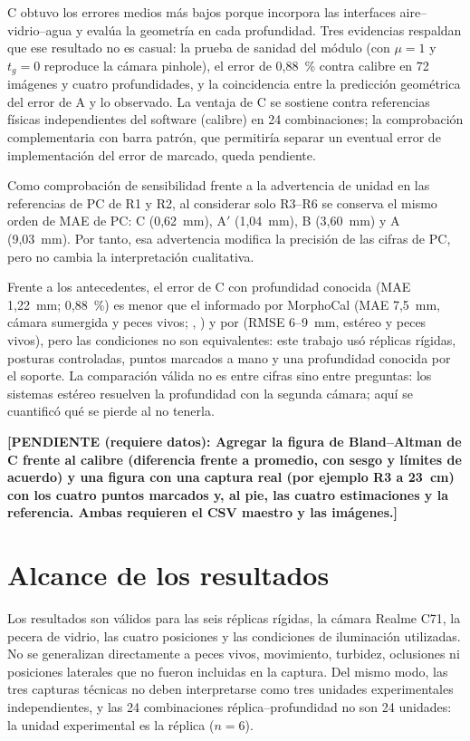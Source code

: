\documentclass{report}
\newcommand{\Aprime}{A$'$}
\newcommand{\pendiente}[1]{\par\textbf{[PENDIENTE (requiere datos): #1]}\par}
\begin{document}
C obtuvo los errores medios más bajos porque incorpora las interfaces aire--vidrio--agua y evalúa la geometría en cada profundidad. Tres evidencias respaldan que ese resultado no es casual: la prueba de sanidad del módulo (con $\mu = 1$ y $t_g = 0$ reproduce la cámara pinhole), el error de 0,88~\% contra calibre en 72 imágenes y cuatro profundidades, y la coincidencia entre la predicción geométrica del error de A y lo observado. La ventaja de C se sostiene contra referencias físicas independientes del software (calibre) en 24 combinaciones; la comprobación complementaria con barra patrón, que permitiría separar un eventual error de implementación del error de marcado, queda pendiente.

Como comprobación de sensibilidad frente a la advertencia de unidad en las referencias de PC de R1 y R2, al considerar solo R3--R6 se conserva el mismo orden de MAE de PC: C (0,62~mm), \Aprime{} (1,04~mm), B (3,60~mm) y A (9,03~mm). Por tanto, esa advertencia modifica la precisión de las cifras de PC, pero no cambia la interpretación cualitativa.

Frente a los antecedentes, el error de C con profundidad conocida (MAE 1,22~mm; 0,88~\%) es menor que el informado por MorphoCal (MAE 7,5~mm, cámara sumergida y peces vivos; \citeauthor{Vijayalakshmi2026}, \citeyear{Vijayalakshmi2026}) y por \textcite{Seibold2026} (RMSE 6--9~mm, estéreo y peces vivos), pero las condiciones no son equivalentes: este trabajo usó réplicas rígidas, posturas controladas, puntos marcados a mano y una profundidad conocida por el soporte. La comparación válida no es entre cifras sino entre preguntas: los sistemas estéreo resuelven la profundidad con la segunda cámara; aquí se cuantificó qué se pierde al no tenerla.

\pendiente{Agregar la figura de Bland--Altman de C frente al calibre (diferencia frente a promedio, con sesgo y límites de acuerdo) y una figura con una captura real (por ejemplo R3 a 23~cm) con los cuatro puntos marcados y, al pie, las cuatro estimaciones y la referencia. Ambas requieren el CSV maestro y las imágenes.}

\section{Alcance de los resultados}

Los resultados son válidos para las seis réplicas rígidas, la cámara Realme C71, la pecera de vidrio, las cuatro posiciones y las condiciones de iluminación utilizadas. No se generalizan directamente a peces vivos, movimiento, turbidez, oclusiones ni posiciones laterales que no fueron incluidas en la captura. Del mismo modo, las tres capturas técnicas no deben interpretarse como tres unidades experimentales independientes, y las 24 combinaciones réplica--profundidad no son 24 unidades: la unidad experimental es la réplica ($n = 6$).
\end{document}
